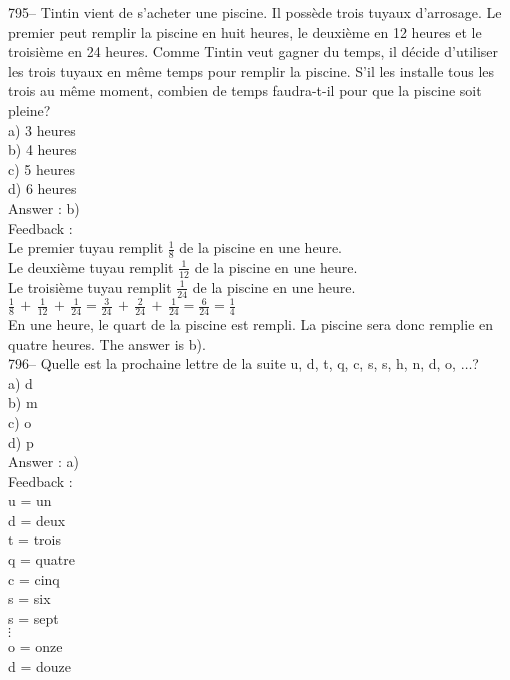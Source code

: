 ﻿\documentclass[letterpaper, 12pt]{article}
\begin{document}
795-- Tintin vient de s'acheter une piscine.  Il poss\`ede trois tuyaux
d'arrosage.  Le premier peut remplir la piscine en huit heures, le
deuxi\`eme en 12 heures et le troisi\`eme en 24 heures.  Comme Tintin veut
gagner du temps, il d\'ecide d'utiliser les trois tuyaux en m\^eme temps
pour remplir la piscine.  S'il les installe tous les trois au m\^eme moment,
combien de temps faudra-t-il pour que la piscine soit pleine?\\
a) 3 heures\\
b) 4 heures\\
c) 5 heures\\
d) 6 heures\\

Answer : b)\\

Feedback : \\
Le premier tuyau remplit $\frac{1}{8}$ de la piscine en une heure.\\[2mm]
Le deuxi\`eme tuyau remplit $\frac{1}{12}$ de la piscine en une
heure.\\[2mm]
Le troisi\`eme tuyau remplit $\frac{1}{24}$ de la piscine en une
heure.\\[2mm]
$\frac{1}{8}\,+\,\frac{1}{12}\,+\,\frac{1}{24}=\frac{3}{24}\,+\,\frac{2}{24}\,+\,\frac{1}{24}=\frac{6}{24}=\frac{1}{4}$\\[2mm]
En une heure, le quart de la piscine est rempli.  La piscine sera donc
remplie en quatre heures.  The answer is b).\\

796-- Quelle est la prochaine lettre de la suite u, d, t, q, c, s, s, h, n,
d, o, $\ldots$?\\
a) d\\
b) m\\
c) o\\
d) p\\

Answer : a)\\

Feedback : \\
u = un\\
d = deux\\
t = trois\\
q = quatre\\
c = cinq\\
s = six\\
s = sept\\
$\vdots$\\
o = onze\\
d = douze\\
\end{document}
